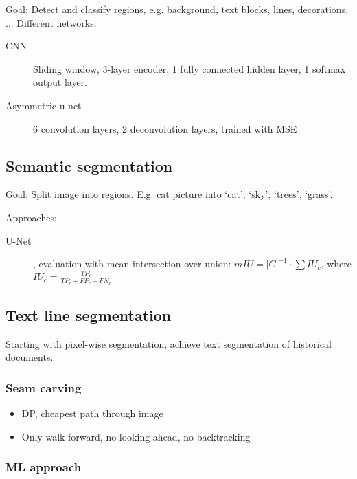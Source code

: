 Goal: Detect and classify regions, e.g. background, text blocks, lines,
decorations, ... Different networks:

\begin{description}
		\item[CNN] Sliding window, 3-layer encoder, 1 fully connected hidden
				layer, 1 softmax output layer.
		\item[Asymmetric u-net] 6 convolution layers, 2 deconvolution layers,
				trained with MSE
\end{description}

\subsection{Semantic segmentation}

Goal: Split image into regions. E.g. cat picture into `cat', `sky', `trees',
`grass'.

Approaches:
\begin{description}
		\item[U-Net], evaluation with mean intersection over union: $mIU =
				|C|^{-1} \cdot \sum IU_c$, where $IU_c = \frac{TP_c}{TP_c +
				FP_c + FN_c}$
\end{description}

\subsection{Text line segmentation}

Starting with pixel-wise segmentation, achieve text segmentation of historical
documents.

\subsubsection{Seam carving}

\begin{itemize}
		\item DP, cheapest path through image
		\item Only walk forward, no looking ahead, no backtracking
\end{itemize}

\subsubsection{ML approach}

